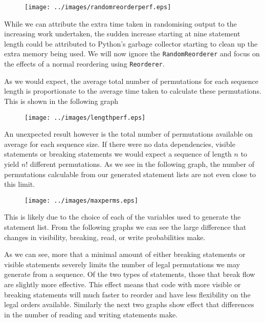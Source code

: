 \documentclass[twoside,a4paper]{report}
\begin{document}
\begin{figure}[h]
\centering
\scalebox{0.75}
{\texttt{[image: ../images/randomreorderperf.eps]}}
\end{figure}

While we can attribute the extra time taken in randomising output to the increasing work undertaken, the sudden increase starting at nine
statement length could be attributed to Python's garbage collector starting to clean up the extra memory being used. We will now ignore the
\texttt{RandomReorderer} and focus on the effects of a normal reordering using \texttt{Reorderer}.

As we would expect, the average total number of permutations for each sequence length is proportionate to the average time taken to calculate these permutations.
This is shown in the following graph

\begin{figure}[h]
\centering
\scalebox{0.75}
{\texttt{[image: ../images/lengthperf.eps]}}
\end{figure}

An unexpected result however is the total number of permutations available on average for each sequence size. If there were no data dependencies, visible statements
or breaking statements we would expect a sequence of length $n$ to yield $n!$ different permutations. As we see in the following graph, the number of permutations
calculable from our generated statement lists are not even close to this limit.

\begin{figure}[h]
\centering
\scalebox{0.75}
{\texttt{[image: ../images/maxperms.eps]}}
\end{figure}

This is likely due to the choice of each of the variables used to generate the statement list. From the following graphs we can see the large
difference that changes in visibility, breaking, read, or write probabilities make.

\begin{figure}[h]
\centering
{}
\end{figure}

As we can see, more that a minimal amount of either breaking statements or visible statements severely limits the number of legal permutations we may
generate from a sequence. Of the two types of statements, those that break flow are slightly more effective. This effect means that code with more
visible or breaking statements will much faster to reorder and have less flexibility on the legal orders available. Similarly the next two graphs show
effect that differences in the number of reading and writing statements make.
\end{document}
